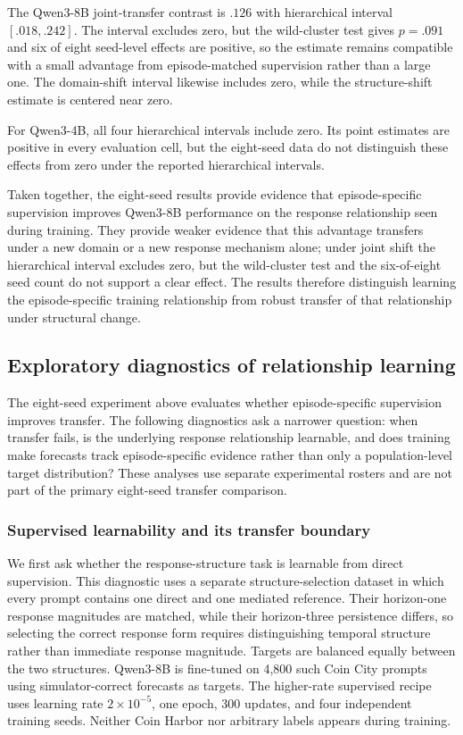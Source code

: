 The Qwen3-8B joint-transfer contrast is $.126$ with hierarchical interval \( [.018,.242] \).
The interval excludes zero, but the wild-cluster test gives \(p=.091\) and six of eight seed-level effects are positive, so the estimate remains compatible with a small advantage from episode-matched supervision rather than a large one.
The domain-shift interval likewise includes zero, while the structure-shift estimate is centered near zero.

For Qwen3-4B, all four hierarchical intervals include zero.
Its point estimates are positive in every evaluation cell, but the eight-seed data do not distinguish these effects from zero under the reported hierarchical intervals.

Taken together, the eight-seed results provide evidence that episode-specific supervision improves Qwen3-8B performance on the response relationship seen during training.
They provide weaker evidence that this advantage transfers under a new domain or a new response mechanism alone; under joint shift the hierarchical interval excludes zero, but the wild-cluster test and the six-of-eight seed count do not support a clear effect.
The results therefore distinguish learning the episode-specific training relationship from robust transfer of that relationship under structural change.

\subsection{Exploratory diagnostics of relationship learning}

The eight-seed experiment above evaluates whether episode-specific supervision improves transfer.
The following diagnostics ask a narrower question: when transfer fails, is the underlying response relationship learnable, and does training make forecasts track episode-specific evidence rather than only a population-level target distribution?
These analyses use separate experimental rosters and are not part of the primary eight-seed transfer comparison.

\subsubsection{Supervised learnability and its transfer boundary}
\label{app:exp3-learnability}

We first ask whether the response-structure task is learnable from direct supervision.
This diagnostic uses a separate structure-selection dataset in which every prompt contains one direct and one mediated reference.
Their horizon-one response magnitudes are matched, while their horizon-three persistence differs, so selecting the correct response form requires distinguishing temporal structure rather than immediate response magnitude.
Targets are balanced equally between the two structures.
Qwen3-8B is fine-tuned on 4,800 such Coin City prompts using simulator-correct forecasts as targets.
The higher-rate supervised recipe uses learning rate \(2\times10^{-5}\), one epoch, 300 updates, and four independent training seeds.
Neither Coin Harbor nor arbitrary labels appears during training.

